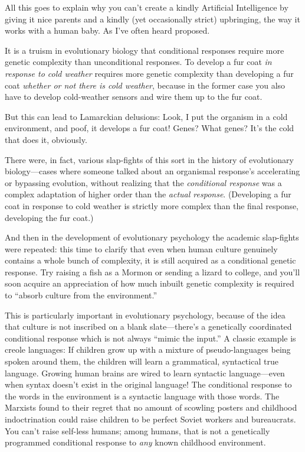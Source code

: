  All this goes to explain why you can't create a
kindly Artificial Intelligence by giving it nice parents and a kindly
(yet occasionally strict) upbringing, the way it works with a human
baby. As I've often heard proposed.


 It is a truism in evolutionary biology that conditional responses
require more genetic complexity than unconditional responses. To
develop a fur coat \textit{in response to cold weather} requires more
genetic complexity than developing a fur coat \textit{whether or not
there is cold weather}, because in the former case you also have to
develop cold-weather sensors and wire them up to the fur coat.


 But this can lead to Lamarckian delusions: Look, I put the
organism in a cold environment, and poof, it develops a fur coat!
Genes? What genes? It's the cold that does it,
obviously.


 There were, in fact, various slap-fights of this sort in the
history of evolutionary biology---cases where someone talked about an
organismal response's accelerating or bypassing
evolution, without realizing that the \textit{conditional response} was
a complex adaptation of higher order than the \textit{actual response}.
(Developing a fur coat in response to cold weather is strictly more
complex than the final response, developing the fur coat.)


 And then in the development of evolutionary psychology the
academic slap-fights were repeated: this time to clarify that even when
human culture genuinely contains a whole bunch of complexity, it is
still acquired as a conditional genetic response. Try raising a fish as
a Mormon or sending a lizard to college, and you'll
soon acquire an appreciation of how much inbuilt genetic complexity is
required to ``absorb culture from the
environment.''


 This is particularly important in evolutionary psychology, because
of the idea that culture is not inscribed on a blank
slate---there's a genetically coordinated conditional
response which is not always ``mimic the
input.'' A classic example is creole languages: If
children grow up with a mixture of pseudo-languages being spoken around
them, the children will learn a grammatical, syntactical true language.
Growing human brains are wired to learn syntactic language---even when
syntax doesn't exist in the original language! The
conditional response to the words in the environment is a syntactic
language with those words. The Marxists found to their regret that no
amount of scowling posters and childhood indoctrination could raise
children to be perfect Soviet workers and bureaucrats. You
can't raise self-less humans; among humans, that is not
a genetically programmed conditional response to \textit{any} known
childhood environment.


